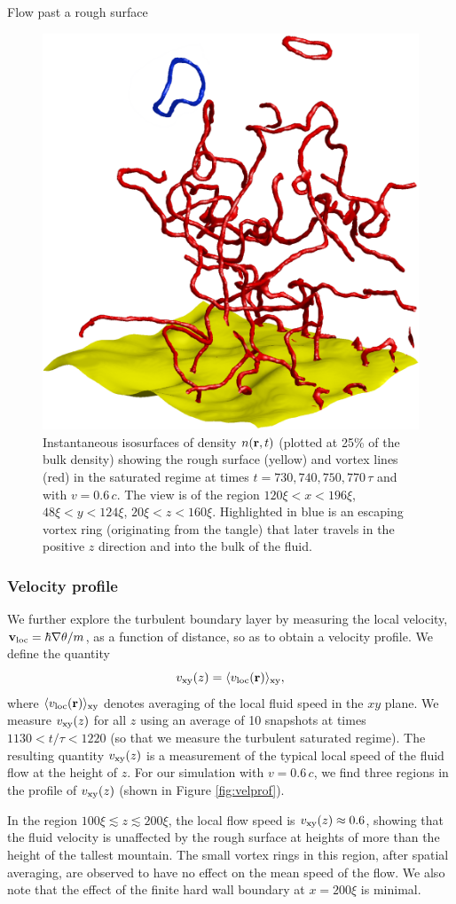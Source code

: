 \begin{chapter}{\label{cha:afm}Flow past a rough surface}
\begin{figure}
\begin{center}
\includegraphics[width=0.25\linewidth]{./afm/mill4}%
\end{center}
\caption{Instantaneous isosurfaces of density $n({\bf r},t)$ 
(plotted at 25\%  of the bulk density) showing the rough surface (yellow) and vortex lines (red) in the saturated regime at times $t=730,740,750,770\,\tau$ and with $v=0.6\,c$. The view is of the region $120\xi<x<196\xi$, $48\xi<y<124\xi$, $20\xi<z<160\xi$. Highlighted in blue is an escaping vortex ring (originating from the tangle) that later travels in the positive $z$ direction and into the bulk of the fluid.}
\label{fig:escapering}
\end{figure}

\subsubsection{Velocity profile}
We further explore the turbulent boundary layer by measuring the local velocity, $\mathbf{v}_{\rm loc} = \hbar\nabla\theta/m$, as a function of distance, so as to obtain a velocity profile. We define the quantity 
\begin{equation}
  v_{\rm xy}(z) = \langle v_{\rm loc}({\bf r}) \rangle_{\rm xy},
\end{equation}
where $\langle v_{\rm loc}({\bf r}) \rangle_{\rm xy}$ denotes averaging of the local fluid speed in the $xy$ plane. We measure $v_{\rm xy}(z)$ for all $z$ using an average of 10 snapshots at times $1130<t/\tau<1220$ (so that we measure the turbulent saturated regime). The resulting quantity $v_{\rm xy}(z)$ is a measurement of the typical local speed of the fluid flow at the height of $z$. For our simulation with $v=0.6\,c$, we find three regions in the profile of $v_{\rm xy}(z)$ (shown in Figure \ref{fig:velprof}).

In the region $100\xi \lesssim z \lesssim 200\xi$, the local flow speed is $v_{\rm xy}(z)\approx0.6$, showing that the fluid velocity is unaffected by the rough surface at heights of more than the height of the tallest mountain. The small vortex rings in this region, after spatial averaging, are observed to have no effect on the mean speed of the flow. We also note that the effect of the finite hard wall boundary at $x=200\xi$ is minimal.


\end{chapter}
